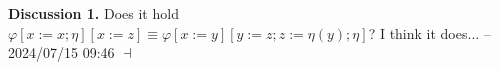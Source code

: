 \documentclass[12pt]{paper}
\newenvironment{context}[1][]
{ \noindent \textbf{{#1}.} }
{ \hfill $ \dashv $ }
\begin{document}
\begin{context}[Discussion 1]
Does it hold $\varphi \left[ x := x ; \eta \right] \left[ x := z \right] \equiv \varphi \left[ x := y \right] \left[ y := z ; z := \eta \left( y \right) ; \eta \right]$? \newline
I think it does... -- 2024/07/15 09:46 
\end{context}

\newpage
\end{document}
